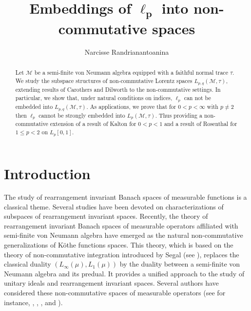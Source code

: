 \documentclass[12pt]{amsart}
\title[non-commutative spaces]{Embeddings of $\ell_{\boldsymbol p}$
into non-commutative spaces}
\author{Narcisse Randrianantoanina}
\let\cal\mathcal
\def\M{{\cal M}}
\numberwithin{equation}{section}
\numberwithin{theorem}{section}
\begin{document}
 \begin{abstract} Let $\M$ be a semi-finite von Neumann algebra
equipped with a faithful normal trace $\tau$. We study the 
subspace structures  of non-commutative Lorentz spaces $L_{p,q}(\M, \tau)$,
extending  results of Carothers and Dilworth to the non-commutative settings.
In particular, we show that,
under natural conditions on indices, $\ell_p$ can not be
embedded into $L_{p,q}(\M, \tau)$. As applications, we prove that 
for $0<p<\infty$ with $p \neq 2$ then $\ell_p$ cannot be strongly embedded into $L_p(\M,\tau)$.
Thus providing a non-commutative extension of 
a result of Kalton for $0<p<1$ and a result of
Rosenthal for $1\leq p <2$  on $L_p[0,1]$.
\end{abstract}

\maketitle

\section{Introduction}
 The study of rearrangement invariant
 Banach spaces of measurable functions is a classical theme.
Several studies have been devoted on characterizations of subspaces of 
rearrangement invariant spaces. 
Recently,  the theory of rearrangement invariant Banach spaces
of measurable operators affiliated with semi-finite von Neumann algebra
have emerged as the natural non-commutative generalizations of 
K\"othe functions spaces. This theory, which is based on
the theory of non-commutative integration introduced by Segal
(see \cite{SEG}), replaces the classical duality $(L_\infty(\mu), L_1(\mu))$
by the duality between a semi-finite von Neumann algebra and its predual.
 It  provides a unified approach  to the study of unitary ideals and
 rearrangement invariant spaces. Several authors have considered 
these non-commutative spaces of measurable operators (see for instance,
\cite{DDP1}, \cite{DDP3}, \cite{D3LS}, \cite{CS} and \cite{KOS2}).
\end{document}

